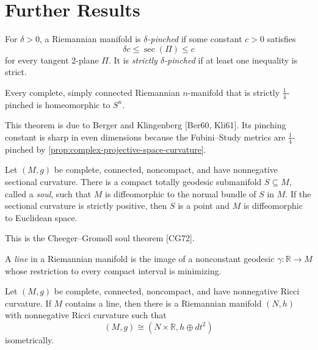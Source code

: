 \section{Further Results}

For $\delta>0$, a Riemannian manifold is \emph{$\delta$-pinched} if some
constant $c>0$ satisfies
\[
\delta c\leq\sec(\Pi)\leq c
\]
for every tangent $2$-plane $\Pi$. It is \emph{strictly
$\delta$-pinched} if at least one inequality is strict.

\begin{theorem}
\label{thm:sphere-theorem}

Every complete, simply connected Riemannian $n$-manifold that is strictly
$\frac14$-pinched is homeomorphic to $S^n$.
\end{theorem}

This theorem is due to Berger and Klingenberg [Ber60, Kli61]. Its pinching
constant is sharp in even dimensions because the Fubini--Study metrics are
$\frac14$-pinched by \cref{prop:complex-projective-space-curvature}.

\begin{theorem}
\label{thm:soul-theorem}

Let $(M,g)$ be complete, connected, noncompact, and have nonnegative
sectional curvature. There is a compact totally geodesic submanifold
$S\subseteq M$, called a \emph{soul}, such that $M$ is diffeomorphic to the
normal bundle of $S$ in $M$. If the sectional curvature is strictly positive,
then $S$ is a point and $M$ is diffeomorphic to Euclidean space.
\end{theorem}

This is the Cheeger--Gromoll soul theorem [CG72].

A \emph{line} in a Riemannian manifold is the image of a nonconstant geodesic
$\gamma:\mathbb R\to M$ whose restriction to every compact interval is
minimizing.

\begin{theorem}
\label{thm:splitting-theorem}

Let $(M,g)$ be complete, connected, noncompact, and have nonnegative Ricci
curvature. If $M$ contains a line, then there is a Riemannian manifold
$(N,h)$ with nonnegative Ricci curvature such that
\[
(M,g)\cong(N\times\mathbb R,h\oplus dt^2)
\]
isometrically.
\end{theorem}

